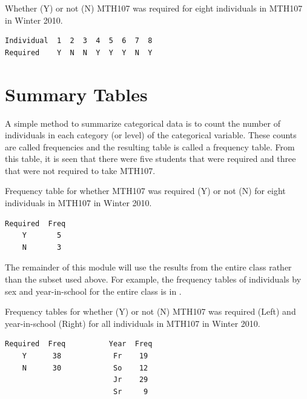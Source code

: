 \documentclass[10pt,openany]{book}\usepackage[]{graphicx}\usepackage[]{color}
\begin{document}
\begin{table}[htbp]
  \caption{Whether (Y) or not (N) MTH107 was required for eight individuals in MTH107 in Winter 2010.}
  \label{tab:MTH107Subset}
  \centering
  \begin{Verbatim}[xleftmargin=10mm]
Individual  1  2  3  4  5  6  7  8
Required    Y  N  N  Y  Y  Y  N  Y
  \end{Verbatim}
\end{table}


\section{Summary Tables}
\vspace{-12pt}
A simple method to summarize categorical data is to count the number of individuals in each category (or level) of the categorical variable.  These counts are called frequencies and the resulting table  is called a frequency table.  From this table, it is seen that there were five students that were required and three that were not required to take MTH107.

\begin{table}[htbp]
  \caption{Frequency table for whether MTH107 was required (Y) or not (N) for eight individuals in MTH107 in Winter 2010.}
  \label{tab:MTH107SubsetFreq}
  \centering
  \begin{Verbatim}[xleftmargin=15mm]
Required  Freq
    Y       5
    N       3
  \end{Verbatim}
\end{table}

\vspace{-12pt}

The remainder of this module will use the results from the entire class rather than the subset used above.  For example, the frequency tables of individuals by sex and year-in-school for the entire class is in .

\begin{table}[htbp]
  \caption{Frequency tables for whether (Y) or not (N) MTH107 was required (Left) and year-in-school (Right) for all individuals in MTH107 in Winter 2010.}
  \label{tab:Mth107Freq}
  \centering
  \begin{Verbatim}[xleftmargin=15mm]
Required  Freq          Year  Freq
    Y      38            Fr    19
    N      30            So    12
                         Jr    29
                         Sr     9
   \end{Verbatim}
\end{table}
\end{document}
